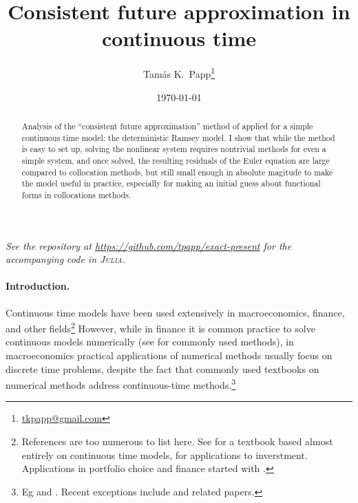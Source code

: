 \documentclass[a4paper,11pt]{article}
\begin{document}
\title{Consistent future approximation in continuous time}
\author{Tam\'as K.~Papp\thanks{\url{tkpapp@gmail.com}}}
\date{\today}
\maketitle

\begin{abstract}
  Analysis of the ``consistent future approximation'' method of \textcite{den2015exact} applied for a simple continuous time model: the deterministic Ramsey model. I show that while the method is easy to set up, solving the nonlinear system requires nontrivial methods for even a simple system, and once solved, the resulting residuals of the Euler equation are large compared to collocation methods, but still small enough in absolute magitude to make the model useful in practice, especially for making an initial guess about functional forms in collocations methods. 
\end{abstract}

\begin{center}
  \textsl{See the repository at \url{https://github.com/tpapp/exact-present} 
    for the accompanying code in \textsc{Julia}\nocite{bezanson17:_julia}.}
\end{center}

\paragraph{Introduction.}

Continuous time models have been used extensively in macroeconomics, finance, and other fields\footnote{References are too numerous to list here. See \textcite{acemoglu2008introduction} for a textbook based almost entirely on continuous time models, \textcite{dixit1996investment} for applications to inverstment. Applications in portfolio choice and finance started with \textcite{merton1971optimum}.} However, while in finance it is common practice to solve continuous models numerically (see \textcite{hull2009options} for commonly used methods), in macroeconomics practical applications of numerical methods usually focus on discrete time problems, despite the fact that commonly used textbooks on numerical methods address continuous-time methods.\footnote{Eg \textcite{judd98:_numer_method_in_econom} and \textcite{miranda02:_applied_comput_econom_and_finan}. Recent exceptions include \textcite{kaplan2016monetary} and related papers.}
\end{document}
